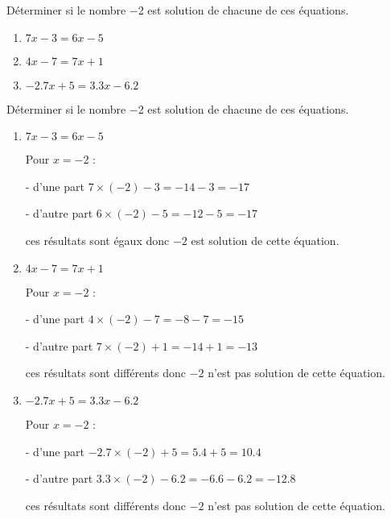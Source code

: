 \begin{exercice*}
    Déterminer si le nombre \num{-2} est solution de chacune de ces équations.
    \begin{enumerate}
        \item $7x-3=6x-5$
        \item $4x-7=7x+1$
        \item $\num{-2.7}x+5=\num{3.3}x-\num{6.2}$
    \end{enumerate}
\end{exercice*}
\begin{corrige}
    Déterminer si le nombre \num{-2} est solution de chacune de ces équations.
    
    \begin{enumerate}
        \item $7x-3=6x-5$
        
        {\color{red}Pour $x=-2$ :
        
        - d'une part $7\times (-2) -3 = -14 - 3 = -17$
        
        - d'autre part $6\times (-2) - 5 = -12 - 5 = -17$
        
        ces résultats sont égaux donc $-2$ est solution de cette équation.
        }
        \item $4x-7=7x+1$
        
        {\color{red}Pour $x=-2$ :
        
        - d'une part $4\times (-2) -7 = -8 - 7 = -15$
        
        - d'autre part $7\times (-2) +1 = -14 +1 = -13$
        
        ces résultats sont différents donc $-2$ n'est pas solution de cette équation.
        }
        \item $\num{-2.7}x+5=\num{3.3}x-\num{6.2}$
        
        {\color{red}Pour $x=-2$ :
        
        - d'une part $\num{-2.7}\times (-2) +5 = \num{5.4}+5 = \num{10.4}$
        
        - d'autre part $\num{3.3}\times (-2) - \num{6.2} = \num{-6.6} - \num{6.2} = \num{-12.8}$
        
        ces résultats sont différents donc $-2$ n'est pas solution de cette équation.
        }
    \end{enumerate}
\end{corrige}


